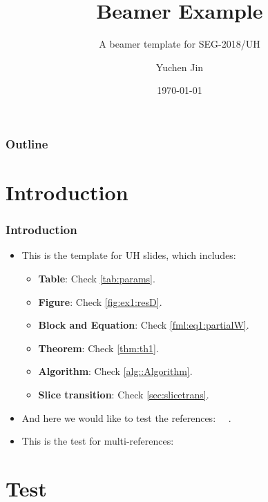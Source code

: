 \documentclass[aspectratio=169]{beamer}
\title[Demo]{Beamer Example}
\author{Yuchen Jin}
\subtitle{A beamer template for SEG-2018/UH}
\date{\today}
\institute[Department of ECE]{University of Houston\\Department of ECE}
\begin{document}
\titleframe

\begin{frame}
    \frametitle{Outline}
    \tableofcontents[currentsection]
\end{frame}

\section{Introduction}
\begin{frame}
\frametitle{Introduction}
  \begin{itemize}
    \item This is the template for UH slides, which includes:
    \begin{itemize}
      \item \textbf{Table}: Check \cref{tab:params}.
      \item \textbf{Figure}: Check \cref{fig:ex1:resD}.
      \item \textbf{Block and Equation}: Check \eqref{fml:eq1:partialW}.
      \item \textbf{Theorem}: Check \cref{thm:th1}.
      \item \textbf{Algorithm}: Check \cref{alg::Algorithm}.
      \item \textbf{Slice transition}: Check \cref{sec:slicetrans}.
    \end{itemize}
    \item And here we would like to test the references: \cite{Zeiler5539957}~\cite{Yang6175956}~\cite{Dong7115171}.
    \item This is the test for multi-references: \cite{Zeiler5539957, Yang6175956, Dong7115171}
  \end{itemize}
\end{frame}

\section{Test}
\end{document}
